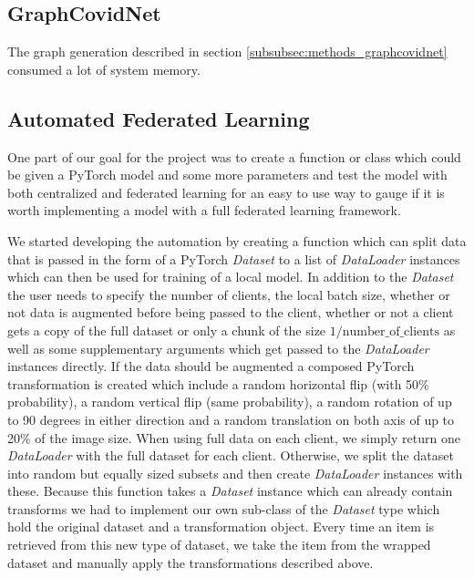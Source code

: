 \subsection{GraphCovidNet}


The graph generation described in section \ref{subsubsec:methods_graphcovidnet} consumed a lot of system memory. 



\subsection{Automated Federated Learning}\label{subsec:methods_automated_fl}
One part of our goal for the project was to create a function or class which could be given a PyTorch model and some more parameters and test the model with both centralized and federated learning for an easy to use way to gauge if it is worth implementing a model with a full federated learning framework. 

We started developing the automation by creating a function which can split data that is passed in the form of a PyTorch \textit{Dataset} to a list of \textit{DataLoader} instances which can then be used for training of a local model. In addition to the \textit{Dataset} the user needs to specify the number of clients, the local batch size, whether or not data is augmented before being passed to the client, whether or not a client gets a copy of the full dataset or only a chunk of the size $ 1 / \text{number\_of\_clients} $ as well as some supplementary arguments which get passed to the \textit{DataLoader} instances directly.
If the data should be augmented a composed PyTorch transformation is created which include a random horizontal flip (with 50\% probability), a random vertical flip (same probability), a random rotation of up to 90 degrees in either direction and a random translation on both axis of up to 20\% of the image size.
When using full data on each client, we simply return one \textit{DataLoader} with the full dataset for each client. Otherwise, we split the dataset into random but equally sized subsets and then create \textit{DataLoader} instances with these. 
Because this function takes a \textit{Dataset} instance which can already contain transforms we had to implement our own sub-class of the \textit{Dataset} type which hold the original dataset and a transformation object. Every time an item is retrieved from this new type of dataset, we take the item from the wrapped dataset and manually apply the transformations described above.

